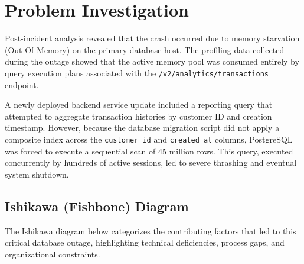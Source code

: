 \documentclass[11pt,a4paper]{article}
\begin{document}
\newpage

\section{Problem Investigation}
Post-incident analysis revealed that the crash occurred due to memory starvation (Out-Of-Memory) on the primary database host. The profiling data collected during the outage showed that the active memory pool was consumed entirely by query execution plans associated with the \texttt{/v2/\allowbreak analytics/\allowbreak transactions} endpoint. 

A newly deployed backend service update included a reporting query that attempted to aggregate transaction histories by customer ID and creation timestamp. However, because the database migration script did not apply a composite index across the \texttt{customer\_id} and \texttt{created\_at} columns, PostgreSQL was forced to execute a sequential scan of 45 million rows. This query, executed concurrently by hundreds of active sessions, led to severe thrashing and eventual system shutdown.

\subsection{Ishikawa (Fishbone) Diagram}
The Ishikawa diagram below categorizes the contributing factors that led to this critical database outage, highlighting technical deficiencies, process gaps, and organizational constraints.
\end{document}
